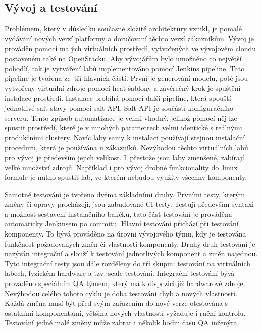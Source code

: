 \subsection{Vývoj a testování}
Problémem, který v důsledku současné složité architektury vznikl, je pomalé vydávání nových verzí platformy a doručovaní těchto verzí zákazníkům. Vývoj je prováděn pomocí malých virtuálních prostředí, vytvořených ve vývojovém cloudu postaveném také na OpenStacku. Aby vývojářům bylo umožněno co největší pohodlí, tak je vytváření labů implementováno pomocí Jenkins pipeline. Tato pipeline je tvořena ze tří hlavních částí. První je generování modelu, poté jsou vytvořeny virtuální zdroje pomocí heat šablony a závěrečný krok je spuštění instalace prostředí. Instalace probíhá pomocí další pipeline, která spouští jednotlivé salt stavy pomocí salt API. Salt API je součástí konfiguračního serveru. Tento způsob automatizace je velmi vhodný, jelikož pomocí něj lze spustit prostředí, které je v mnohých parametrech velmi identické s reálnými produkčními clustery. Navíc laby samy k instalaci používají stejnou instalační proceduru, která je používána u zákazníků. Nevýhodou těchto virtuálních labů pro vývoj je především jejich velikost. I přestože jsou laby zmenšené, zabírají velké množství zdrojů. Například i pro vývoj drobné funkcionality do linux formule je nutno spustit lab, ve kterém nebudou využity všechny komponenty.

Samotné testování je tvořeno dvěma základními druhy. Prvními testy, kterým změny či opravy procházejí, jsou zabudované CI testy. Testují především syntaxi a možnost sestavení instalačního balíčku, tato část testování je prováděna automaticky Jenkinsem po commitu. Hlavní testování přichází při testování komponenty. To bývá prováděno na úrovni vývojového týmu, kdy je testována funkčnost požadovaných změn či vlastností komponenty. Druhý druh testování je nazýván integrační a slouží k testování jednotlivých komponent a změn najednou. Tyto integrační testy jsou dále rozděleny do tří skupin: testování na virtuálních labech, fyzickém hardware a tzv. scale testování. Integrační testování bývá prováděno speciálním QA týmem, který má k dispozici již hardwarové zdroje. Nevýhodou celého tohoto cyklu je doba testování chyb a nových vlastností. Každá změna musí být před svým zařazením do nové verze otestována s ostatními komponentami, většina nových vlastností vyžaduje i ruční kontrolu. Testování jedné malé změny může zabrat i několik hodin času QA inženýra.
